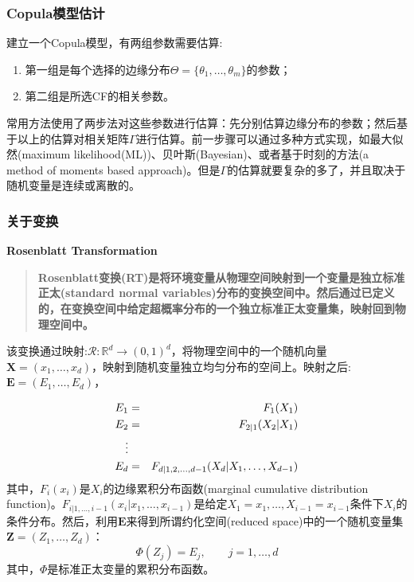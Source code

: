 \subsubsection{Copula模型估计}
建立一个Copula模型，有两组参数需要估算:
\begin{enumerate}
    \item 第一组是每个选择的边缘分布$\Theta = \{\theta_1,\dots,\theta_m\}$的参数；
    \item 第二组是所选CF的相关参数。
\end{enumerate}
常用方法使用了两步法对这些参数进行估算：先分别估算边缘分布的参数；然后基于以上的估算对相关矩阵$\Gamma$进行估算。前一步骤可以通过多种方式实现，如最大似然(maximum likelihood(ML))、贝叶斯(Bayesian)、或者基于时刻的方法(a method of moments based approach)。但是$\Gamma$的估算就要复杂的多了，并且取决于随机变量是连续或离散的。

\subsubsection{关于变换}
\textbf{\textcolor[rgb]{1,0,0}{Rosenblatt Transformation}}
\begin{quotation}
    \textbf{\textcolor[rgb]{1,0,0}{Rosenblatt变换(RT)是将环境变量从物理空间映射到一个变量是独立标准正太(standard normal variables)分布的变换空间中。然后通过已定义的，在变换空间中给定超概率分布的一个独立标准正太变量集，映射回到物理空间中。}}\cite{Montes2015}
\end{quotation}


该变换通过映射:$\mathcal{R}: \mathbb{R}^d \rightarrow (0,1)^d$，将物理空间中的一个随机向量$\mathbf{X}=(x_1,\dots,x_d)$，映射到随机变量独立均匀分布的空间上。映射之后:$\mathbf{E} = (E_1,\dots,E_d)$\cite{Montes2015}，

\begin{eqnarray}
    E_1 &=& F_1(X_1)  \notag \\
    E_2 &=& F_{2|1}(X_2|X_1) \notag \\
    \vdots \\
    E_d &=& F_{d|1,2,\dots,d-1} (X_d | X_1,\dots,X_{d-1}) \notag
    \label{eq-rosenblatt}
\end{eqnarray}
其中，$F_i(x_i)$是$X_i$的\textcolor[rgb]{1,0,0}{边缘累积分布函数(marginal cumulative distribution function)}。$F_{i|1,\dots,i-1}(x_i|x_1,\dots,x_{i-1})$是给定$X_1 = x_1,\dots,X_{i-1}=x_{i-1}$条件下$X_i$的条件分布。然后，利用$\mathbf{E}$来得到所谓\textcolor[rgb]{1,0,0}{约化空间(reduced space)}中的一个随机变量集$\mathbf{Z} = (Z_1,\dots,Z_d)$：
\begin{equation}
    \Phi (Z_j) = E_j, \qquad j=1,\dots,d
    \label{eq-cdf}
\end{equation}
其中，$\Phi$是标准正太变量的累积分布函数。


